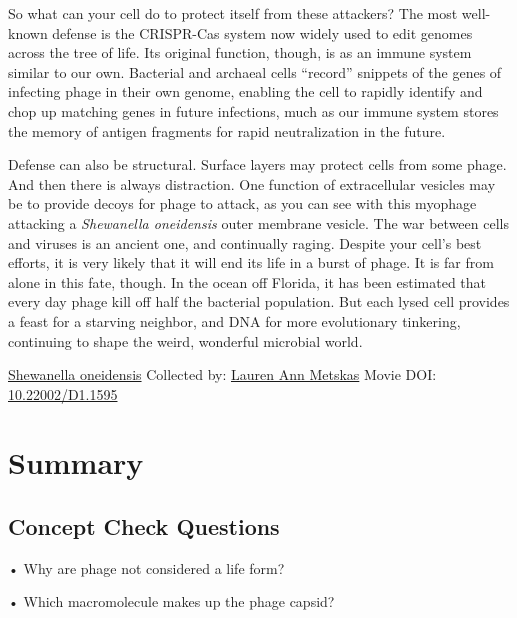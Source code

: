\documentclass[]{tufte-book}
\begin{document}
So what can your cell do to protect itself from these attackers? The most well-known defense is the CRISPR-Cas system now widely used to edit genomes across the tree of life. Its original function, though, is as an immune system similar to our own. Bacterial and archaeal cells ``record'' snippets of the genes of infecting phage in their own genome, enabling the cell to rapidly identify and chop up matching genes in future infections, much as our immune system stores the memory of antigen fragments for rapid neutralization in the future.

Defense can also be structural. Surface layers may protect cells from some phage. And then there is always distraction. One function of extracellular vesicles may be to provide decoys for phage to attack, as you can see with this myophage attacking a \emph{Shewanella oneidensis} outer membrane vesicle. The war between cells and viruses is an ancient one, and continually raging. Despite your cell's best efforts, it is very likely that it will end its life in a burst of phage. It is far from alone in this fate, though. In the ocean off Florida, it has been estimated that every day phage kill off half the bacterial population. But each lysed cell provides a feast for a starving neighbor, and DNA for more evolutionary tinkering, continuing to shape the weird, wonderful microbial world.



\hypertarget{htmlwidget-286f5bffecbd334fc6d2}{}

\label{fig:10-10}\protect\hyperlink{tree}{Shewanella oneidensis} Collected by: \protect\hyperlink{lauren_ann_metskas}{Lauren Ann Metskas} Movie DOI: \href{https://doi.org/10.22002/D1.1595}{10.22002/D1.1595}

\hypertarget{summary-9}{%
\section{Summary}\label{summary-9}}

\hypertarget{concept-check-questions-9}{%
\subsection*{Concept Check Questions}\label{concept-check-questions-9}}

• Why are phage not considered a life form?

• Which macromolecule makes up the phage capsid?
\end{document}
